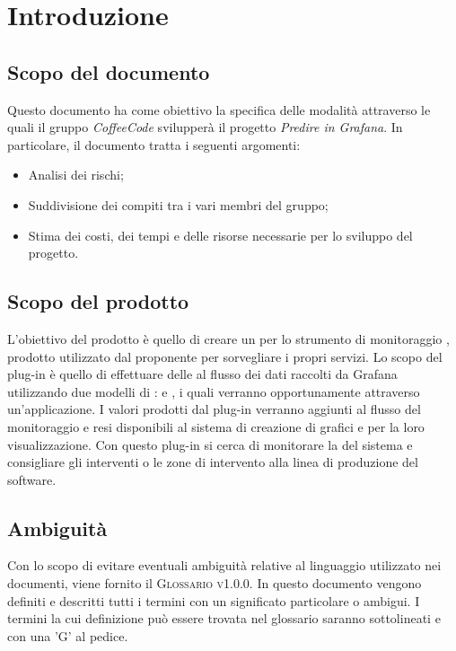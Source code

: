 \documentclass[../piano-di-progetto.tex]{subfiles}
\begin{document}
\section{Introduzione}
\subsection{Scopo del documento}
Questo documento ha come obiettivo la specifica delle modalità attraverso le quali il gruppo \emph{CoffeeCode} svilupperà il progetto \emph{Predire in Grafana}. In particolare, il documento tratta i seguenti argomenti:
\begin{itemize}
  \item Analisi dei rischi;
  \item Suddivisione dei compiti tra i vari membri del gruppo;
  \item Stima dei costi, dei tempi e delle risorse necessarie per lo sviluppo del progetto.
\end{itemize}

\subsection{Scopo del prodotto}
L'obiettivo del prodotto è quello di creare un  per lo strumento di monitoraggio , prodotto utilizzato dal proponente per sorvegliare i propri servizi. Lo scopo del plug-in è quello di effettuare delle  al flusso dei dati raccolti da Grafana utilizzando due modelli di :  e , i quali verranno opportunamente  attraverso un'applicazione. I valori prodotti dal plug-in verranno aggiunti al flusso del monitoraggio e resi disponibili al sistema di creazione di grafici e  per la loro visualizzazione. Con questo plug-in si cerca di monitorare la  del sistema e consigliare gli interventi o le zone di intervento alla linea di produzione del software.


\subsection{Ambiguità}
Con lo scopo di evitare eventuali ambiguità relative al linguaggio utilizzato nei documenti, viene fornito il \textsc{Glossario v1.0.0}. In questo documento vengono definiti e descritti tutti i termini con un significato particolare o ambigui. I termini la cui definizione può essere trovata nel glossario saranno sottolineati e con una 'G' al pedice.
\end{document}

